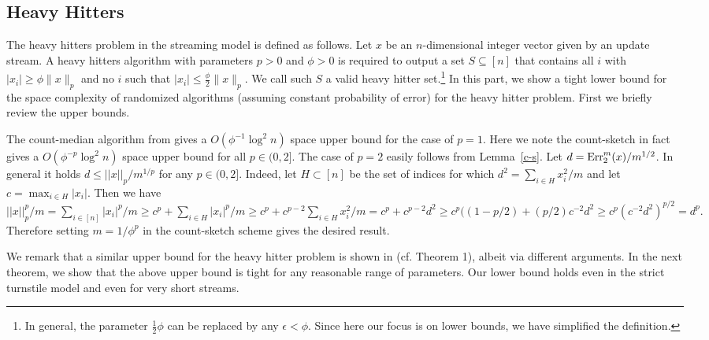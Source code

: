 \subsection{Heavy Hitters}\label{sec:hh}
The heavy hitters problem in the streaming model is defined as follows. Let
$x$ be an $n$-dimensional integer vector given by an update stream.
A heavy hitters algorithm with parameters $p>0$ and $\phi>0$ is
required to output a set $S\subseteq [n]$ that contains
all $i$ with $|x_i|\geq \phi\|x\|_p$ and no $i$ such
that $|x_i|\leq \frac{\phi}{2}\|x\|_p$. We call such $S$ a valid heavy hitter
set.\footnote{ In general, the parameter $\frac12\phi$
can be replaced by any $\epsilon < \phi$. 
 Since here our 
focus is on lower bounds, we have simplified the definition.} 
In this part, we show a tight lower bound for the
 space complexity of randomized algorithms (assuming
constant probability of error) for 
the heavy hitter problem. First we briefly review the upper bounds.

The count-median algorithm from \cite{CormodeM05} gives
 a $O(\phi^{-1}\log^2 n)$ space upper bound for the case of $p=1$.
Here we note the count-sketch \cite{CharikarCF04} in fact 
gives a $O(\phi^{-p}\log^2 n)$ space upper bound for all $p \in (0,2]$.
The case of $p=2$ easily follows from Lemma~\ref{c-s}. Let $d=\operatorname{Err}^m_2(x)/m^{1/2}$.
In general it holds $d \le ||x||_p/m^{1/p}$ for any
$p\in(0,2]$. Indeed, let $H \subset [n]$ be the set of indices for which
$ d^2=\sum_{i\in H}x_i^2/m$ and let $c=\max_{i\in H}|x_i|$. Then we have
$||x||_p^p/m=\sum_{i\in[n]}|x_i|^p/m\ge c^p+\sum_{i\in H}|x_i|^p/m\ge
c^p+c^{p-2}\sum_{i\in
H}x_i^2/m=c^p+c^{p-2}d^2\ge c^p((1-p/2)+(p/2)c^{-2}d^2\ge
c^p(c^{-2}d^2)^{p/2}=d^p.$ Therefore setting $m=1/\phi^p$ in the count-sketch
scheme gives the desired result.


We remark that a similar upper bound for the heavy hitter problem is 
shown in \cite{KaneNPW} (cf. Theorem 1), albeit via different arguments.  
%
%
In the next theorem, we show that the above upper bound is tight for
any reasonable range of parameters. Our lower bound holds even in the strict
turnstile model and even for very short streams.

